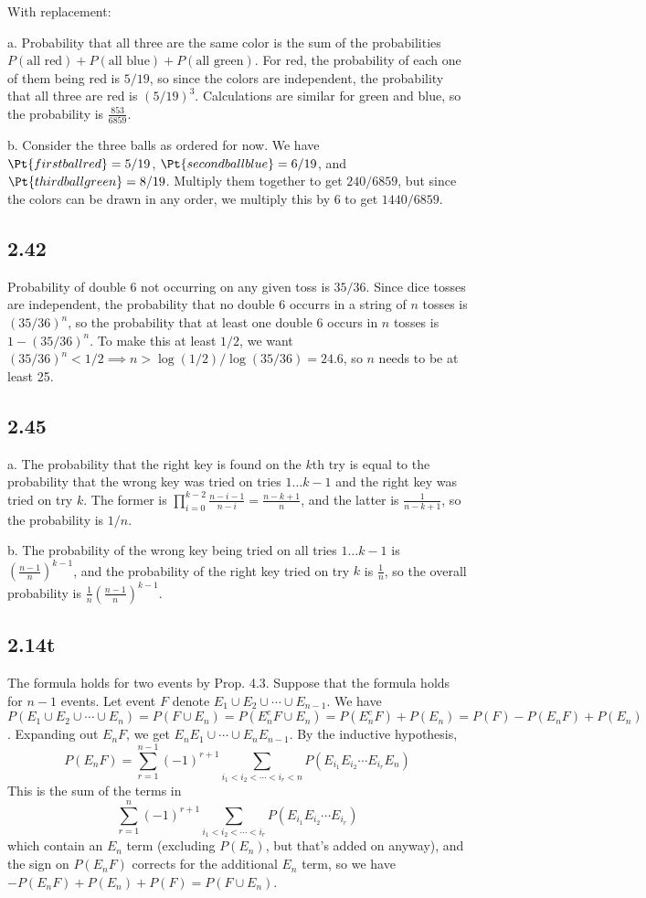 \documentclass{article}
\begin{document}
With replacement:

a. Probability that all three are the same color is the sum of the probabilities $P(\text{all red})+P(\text{all blue})+P(\text{all green})$. For red, the probability of each one of them being red is $5/19$, so since the colors are independent, the probability that all three are red is $(5/19)^3$. Calculations are similar for green and blue, so the probability is $\frac{853}{6859}$.

b. Consider the three balls as ordered for now. We have $\Pt{first ball red}=5/19$, $\Pt{second ball blue}=6/19$, and $\Pt{third ball green}=8/19$. Multiply them together to get $240/6859$, but since the colors can be drawn in any order, we multiply this by $6$ to get $1440/6859$.

\subsection*{2.42}
Probability of double $6$ not occurring on any given toss is $35/36$. Since dice tosses are independent, the probability that no double 6 occurrs in a string of $n$ tosses is $(35/36)^n$, so the probability that at least one double $6$ occurs in $n$ tosses is $1-(35/36)^n$. To make this at least $1/2$, we want $(35/36)^n<1/2\implies n>\log(1/2)/\log(35/36)=24.6$, so $n$ needs to be at least 25.
\subsection*{2.45}
a. The probability that the right key is found on the $k$th try is equal to the probability that the wrong key was tried on tries $1\ldots k-1$ and the right key was tried on try $k$. The former is $\prod_{i=0}^{k-2}\frac{n-i-1}{n-i}=\frac{n-k+1}{n}$, and the latter is $\frac{1}{n-k+1}$, so the probability is $1/n$. 

b. The probability of the wrong key being tried on all tries $1\ldots k-1$ is $\left(\frac{n-1}{n}\right)^{k-1}$, and the probability of the right key tried on try $k$ is $\frac{1}{n}$, so the overall probability is $\frac{1}{n}\left(\frac{n-1}{n}\right)^{k-1}$.
\subsection*{2.14t}
The formula holds for two events by Prop. 4.3. Suppose that the formula holds for $n-1$ events. Let event $F$ denote $E_1\cup E_2\cup\cdots\cup E_{n-1}$. We have $P(E_1\cup E_2\cup\cdots\cup E_n)=P(F\cup E_n)=P(E_n^cF\cup E_n)=P(E_n^cF)+P(E_n)=P(F)-P(E_nF)+P(E_n)$. Expanding out $E_nF$, we get $E_nE_1\cup\cdots\cup E_nE_{n-1}$. By the inductive hypothesis, 
$$P(E_nF)=\sum_{r=1}^{n-1}(-1)^{r+1}\sum_{i_1<i_2<\cdots<i_r<n}P(E_{i_1}E_{i_2}\cdots E_{i_r}E_n)$$
This is the sum of the terms in 
$$\sum_{r=1}^n(-1)^{r+1}\sum_{i_1<i_2<\cdots<i_r}P(E_{i_1}E_{i_2}\cdots E_{i_r})$$
which contain an $E_n$ term (excluding $P(E_n)$, but that's added on anyway), and the sign on $P(E_nF)$ corrects for the additional $E_n$ term, so we have $-P(E_nF)+P(E_n)+P(F)=P(F\cup E_n)$.
\end{document}
